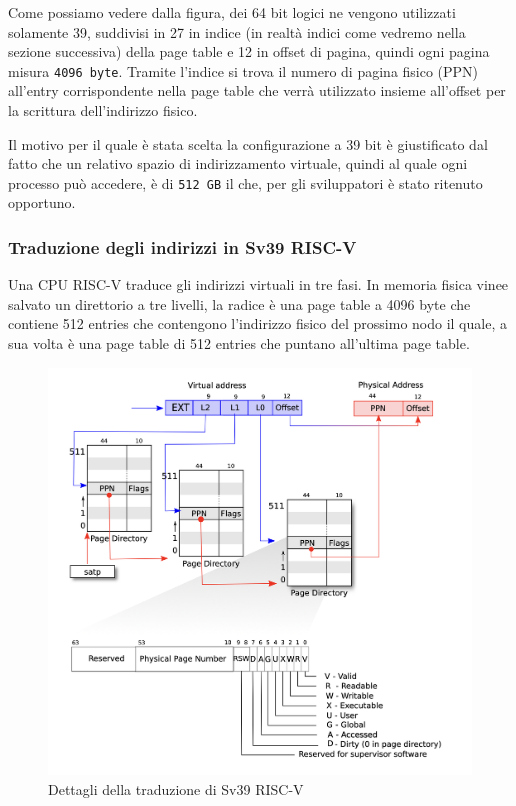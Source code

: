 Come possiamo vedere dalla figura, dei 64 bit logici ne vengono utilizzati solamente 39, suddivisi in 27 in indice (in realtà indici come vedremo nella sezione successiva) della page table e 12 in offset di pagina, quindi ogni pagina misura \lstinline{4096 byte}. Tramite l'indice si trova il numero di pagina fisico (PPN) all'entry corrispondente nella page table che verrà utilizzato insieme all'offset per la scrittura dell'indirizzo fisico.

Il motivo per il quale è stata scelta la configurazione a 39 bit è giustificato dal fatto che un relativo spazio di indirizzamento virtuale, quindi al quale ogni processo può accedere, è di \lstinline{512 GB} il che, per gli sviluppatori è stato ritenuto opportuno.
\subsubsection{Traduzione degli indirizzi in Sv39 RISC-V}
Una CPU RISC-V traduce gli indirizzi virtuali in tre fasi. In memoria fisica vinee salvato un direttorio a tre livelli, la radice è una page table a 4096 byte che contiene 512 entries che contengono l'indirizzo fisico del prossimo nodo il quale, a sua volta è una page table di 512 entries che puntano all'ultima page table.
\begin{figure}[hbt!]
    \centering
    \includegraphics[width=\textwidth]{Memoria Virtuale/images/three-level paging.png}
    \caption{Dettagli della traduzione di Sv39 RISC-V}
    \label{fig:3-level_paging}
\end{figure}

